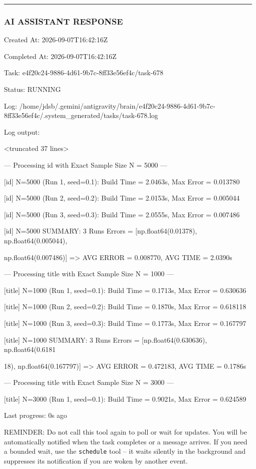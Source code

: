 \documentclass[11pt,a4paper]{article}
\begin{document}
\hrule

\subsubsection{AI ASSISTANT RESPONSE}

Created At: 2026-09-07T16:42:16Z

Completed At: 2026-09-07T16:42:16Z

Task: e4f20c24-9886-4d61-9b7c-8ff33e56ef4c/task-678

Status: RUNNING

Log: /home/jdsb/.gemini/antigravity/brain/e4f20c24-9886-4d61-9b7c-8ff33e56ef4c/.system\_generated/tasks/task-678.log

Log output:

<truncated 37 lines>


--- Processing id with Exact Sample Size N = 5000 ---

[id] N=5000 (Run 1, seed=0.1): Build Time = 2.0463s, Max Error = 0.013780

[id] N=5000 (Run 2, seed=0.2): Build Time = 2.0153s, Max Error = 0.005044

[id] N=5000 (Run 3, seed=0.3): Build Time = 2.0555s, Max Error = 0.007486

[id] N=5000 SUMMARY: 3 Runs Errors = [np.float64(0.01378), np.float64(0.005044),

np.float64(0.007486)] => AVG ERROR = 0.008770, AVG TIME = 2.0390s


--- Processing title with Exact Sample Size N = 1000 ---

[title] N=1000 (Run 1, seed=0.1): Build Time = 0.1713s, Max Error = 0.630636

[title] N=1000 (Run 2, seed=0.2): Build Time = 0.1870s, Max Error = 0.618118

[title] N=1000 (Run 3, seed=0.3): Build Time = 0.1773s, Max Error = 0.167797

[title] N=1000 SUMMARY: 3 Runs Errors = [np.float64(0.630636), np.float64(0.6181

18), np.float64(0.167797)] => AVG ERROR = 0.472183, AVG TIME = 0.1786s

--- Processing title with Exact Sample Size N = 3000 ---

[title] N=3000 (Run 1, seed=0.1): Build Time = 0.9021s, Max Error = 0.624589


Last progress: 0s ago



REMINDER: Do not call this tool again to poll or wait for updates. You will be automatically notified when the task completes or a message arrives. If you need a bounded wait, use the \texttt{schedule} tool -- it waits silently in the background and suppresses its notification if you are woken by another event.
\end{document}
